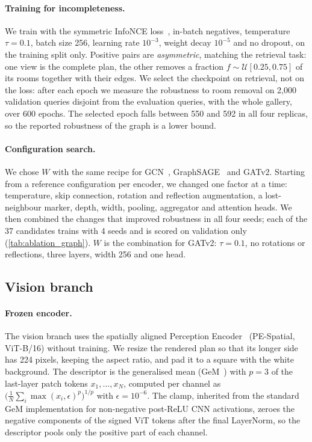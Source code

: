 \paragraph{Training for incompleteness.}
We train with the symmetric InfoNCE loss~\cite{oord2019cpc}, in-batch negatives, temperature $\tau=0.1$, batch size 256, learning rate $10^{-3}$, weight decay $10^{-5}$ and no dropout, on the training split only.
Positive pairs are \emph{asymmetric}, matching the retrieval task: one view is the complete plan, the other removes a fraction $f\sim\mathcal{U}[0.25,0.75]$ of its rooms together with their edges.
We select the checkpoint on retrieval, not on the loss: after each epoch we measure the robustness to room removal on 2{,}000 validation queries disjoint from the evaluation queries, with the whole gallery, over 600 epochs.
The selected epoch falls between 550 and 592 in all four replicas, so the reported robustness of the graph is a lower bound.

\paragraph{Configuration search.}
We chose $W$ with the same recipe for GCN~\cite{kipf2017gcn}, GraphSAGE~\cite{hamilton2017graphsage} and GATv2.
Starting from a reference configuration per encoder, we changed one factor at a time: temperature, skip connection, rotation and reflection augmentation, a lost-neighbour marker, depth, width, pooling, aggregator and attention heads.
We then combined the changes that improved robustness in all four seeds; each of the 37 candidates trains with 4 seeds and is scored on validation only (\cref{tab:ablation_graph}).
$W$ is the combination for GATv2: $\tau=0.1$, no rotations or reflections, three layers, width 256 and one head.

\subsection{Vision branch}
\label{sec:method_vision}

\paragraph{Frozen encoder.}
The vision branch uses the spatially aligned Perception Encoder~\cite{bolya2025perception} (PE-Spatial, ViT-B/16) without training.
We resize the rendered plan so that its longer side has 224 pixels, keeping the aspect ratio, and pad it to a square with the white background.
The descriptor is the generalised mean (GeM~\cite{radenovic2019gem}) with $p=3$ of the last-layer patch tokens $x_1,\dots,x_N$, computed per channel as $\bigl(\tfrac{1}{N}\sum_i \max(x_i,\epsilon)^p\bigr)^{1/p}$ with $\epsilon=10^{-6}$.
The clamp, inherited from the standard GeM implementation for non-negative post-ReLU CNN activations, zeroes the negative components of the signed ViT tokens after the final LayerNorm, so the descriptor pools only the positive part of each channel.

